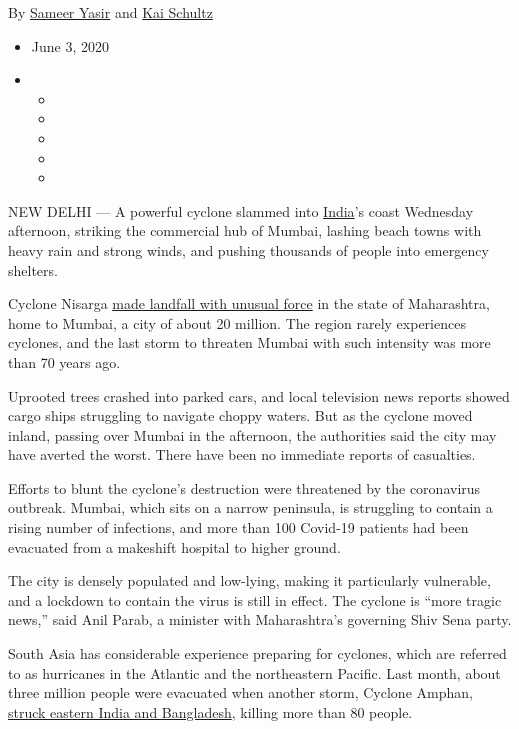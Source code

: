 By \href{https://www.nytimes.com/by/sameer-yasir}{Sameer Yasir} and
\href{https://www.nytimes.com/by/kai-schultz}{Kai Schultz}

\begin{itemize}
\item
  June 3, 2020
\item
  \begin{itemize}
  \item
  \item
  \item
  \item
  \item
  \end{itemize}
\end{itemize}

NEW DELHI --- A powerful cyclone slammed into
\href{https://www.nytimes.com/2020/06/25/world/asia/india-monsoon-lightning-rainstorms.html}{India}'s
coast Wednesday afternoon, striking the commercial hub of Mumbai,
lashing beach towns with heavy rain and strong winds, and pushing
thousands of people into emergency shelters.

Cyclone Nisarga
\href{https://www.hindustantimes.com/india-news/cyclone-nisarga-closes-in-215km-from-mumbai-imd/story-tv1tkoMNdTPFluAGXy39oM.html}{made
landfall with unusual force} in the state of Maharashtra, home to
Mumbai, a city of about 20 million. The region rarely experiences
cyclones, and the last storm to threaten Mumbai with such intensity was
more than 70 years ago.

Uprooted trees crashed into parked cars, and local television news
reports showed cargo ships struggling to navigate choppy waters. But as
the cyclone moved inland, passing over Mumbai in the afternoon, the
authorities said the city may have averted the worst. There have been no
immediate reports of casualties.

Efforts to blunt the cyclone's destruction were threatened by the
coronavirus outbreak. Mumbai, which sits on a narrow peninsula, is
struggling to contain a rising number of infections, and more than 100
Covid-19 patients had been evacuated from a makeshift hospital to higher
ground.

The city is densely populated and low-lying, making it particularly
vulnerable, and a lockdown to contain the virus is still in effect. The
cyclone is ``more tragic news,'' said Anil Parab, a minister with
Maharashtra's governing Shiv Sena party.

South Asia has considerable experience preparing for cyclones, which are
referred to as hurricanes in the Atlantic and the northeastern Pacific.
Last month, about three million people were evacuated when another
storm, Cyclone Amphan,
\href{https://www.nytimes.com/2020/05/20/world/asia/cyclone-amphan-india-bangladesh.html}{struck
eastern India and Bangladesh}, killing more than 80 people.

